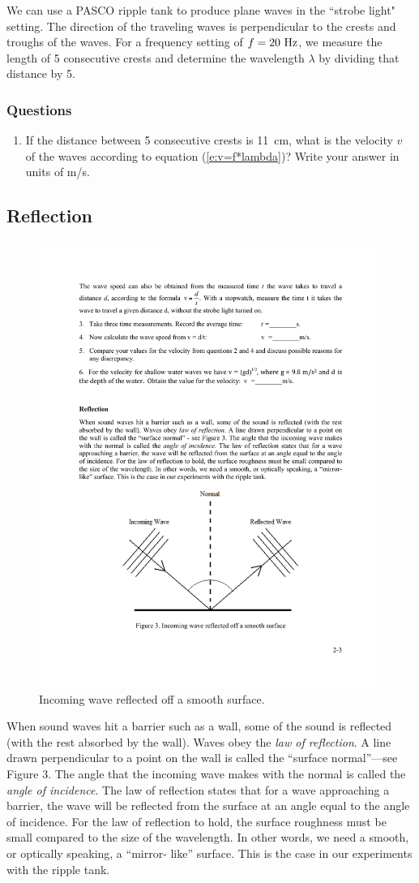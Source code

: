 \documentclass[11pt]{NSF}
\def\ben{\begin{enumerate}}
\def\een{\end{enumerate}}
\def\i{\item{}}
\begin{document}
We can use a PASCO ripple tank to produce plane waves in the ``strobe
light" setting.
The direction of the traveling waves is perpendicular to the 
crests and troughs of the waves.
For a frequency setting of $f=20~{\rm Hz}$, we measure the
length of 5 consecutive crests and determine the wavelength $\lambda$
by dividing that distance by 5.

\subsubsection*{Questions}
\ben

\i 
If the distance between 5 consecutive crests is 11~cm, what is the 
velocity $v$ of the waves according to equation (\ref{e:v=f*lambda})?
Write your answer in units of m/s.
\een

\subsection{Reflection}
%
\begin{figure}[hbtp]
\begin{center}
\includegraphics[width=.6\textwidth]{fig2_3}
\caption{Incoming wave reflected off a smooth surface.}
\label{f:3}
\end{center}
\end{figure}
%
When sound waves hit a barrier such as a wall, some of the sound is reflected
(with the rest absorbed by the wall). 
Waves obey the {\em law of reflection}. 
A line
drawn perpendicular to a point on the wall is called the ``surface normal”---see
Figure 3. The angle that the incoming wave makes with the normal is called the
{\em angle of incidence}. The law of reflection states that for a wave approaching a
barrier, the wave will be reflected from the surface at an angle equal to the
angle of incidence. For the law of reflection to hold, the surface roughness
must be small compared to the size of the wavelength. In other words, we need a
smooth, or optically speaking, a ``mirror- like” surface. This is the case in
our experiments with the ripple tank.
\end{document}
